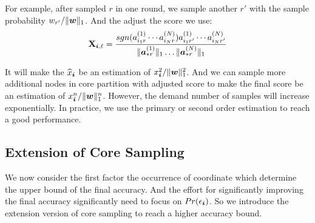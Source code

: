 \documentclass[letterpaper]{article}
\newcommand{\Sca}[3]{{#1}^{(#2)}_{i_#2#3}}%
\newcommand{\V}[1]{{\bm{{\MakeLowercase{#1}}}}}
\newcommand{\VnC}[3]{\V{#1}^{(#2)}_{#3}}
\newcommand{\Nrocl}[2]{\norm{\VnC{a}{#1}{*#2}}{1}}
\newcommand{\M}[1]{{\bm{\mathbf{\MakeUppercase{#1}}}}}
\newcommand{\norm}[2]{\|#1\|_{#2}}
\newcommand{\WreightR}{\Nrocl{1}{r}\ldots\Nrocl{N}{r}}
\begin{document}
For example, after sampled $r$ in one round,
we sample another $r'$ with the sample probability $w_{r'}/\norm{\V{w}}{1}$.
And the adjust the score we use:
\[
\M{X}_{\V{i},\ell}  = \frac{sgn(\Sca{a}{1}{r}\cdots\Sca{a}{N}{r})\Sca{a}{1}{r'}\cdots\Sca{a}{N}{r'}}{\WreightR}
\]

It will make the $\widehat{x}_{\V{i}}$ be an estimation of $x_{\V{i}}^2/\norm{\V{w}}{1}^2$.
And we can sample more additional nodes in core partition with adjusted score 
to make the final score be an estimation of $x_{\V{i}}^n/\norm{\V{w}}{1}^n$.
However, the demand number of samples will increase exponentially.
In practice, we use the primary or second order estimation to reach a good performance.

\subsection{Extension of Core Sampling}

We now consider the first factor the occurrence of coordinate 
which determine the upper bound of the final accuracy.
And the effort for significantly improving the final accuracy significantly
need to focus on $Pr(\epsilon_{\V{i}})$.
So we introduce the extension version of core sampling to reach a higher accuracy bound.
\end{document}
